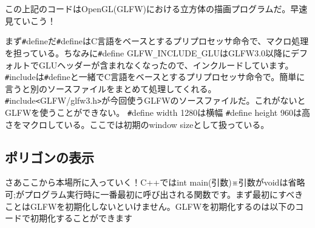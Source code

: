 \documentclass[a4paper,titlepage]{jsarticle}
\begin{document}
この上記のコードはOpenGL(GLFW)における立方体の描画プログラムだ。早速見ていこう！

まず\verb|#|defineだ\verb|#|defineはC言語をベースとするプリプロセッサ命令で、マクロ処理を担っている。ちなみに\verb|#|define GLFW\verb|_|INCLUDE\verb|_|GLUはGLFW3.0以降にデフォルトでGLUヘッダーが含まれなくなったので、インクルードしています。
\verb|#|includeは\verb|#|defineと一緒でC言語をベースとするプリプロセッサ命令で。簡単に言うと別のソースファイルをまとめて処理してくれる。
\verb|#|include\verb|<|GLFW/glfw3.h\verb|>|が今回使うGLFWのソースファイルだ。これがないとGLFWを使うことができない。
\verb|#|define width 1280は横幅 \verb|#|define height 960は高さをマクロしている。ここでは初期のwindow sizeとして扱っている。

\subsection{ポリゴンの表示}

さあここから本場所に入っていく！C++ではint main(引数)※引数がvoidは省略可;がプログラム実行時に一番最初に呼び出される関数です。まず最初にすべきことはGLFWを初期化しないといけません。GLFWを初期化するのは以下のコードで初期化することができます
\end{document}
